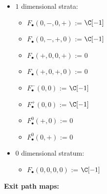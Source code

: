 \begin{itemize}
\item $1$ dimensional strata:
\begin{itemize}
\item $F_\bullet(0,-,0,+)$ := $\C[-1]$
\item $F_\bullet(0,-,+,0)$ := $\C[-1]$
\item $F_\bullet(+,0,0,+)$ := $0$
\item $F_\bullet(+,0,+,0)$ := $0$
\item $F_\bullet^-(0,0)$ := $\C[-1]$
\item $F_\bullet^+(0,0)$ := $\C[-1]$
\item $F_\bullet^0(+,0)$ := $0$
\item $F_\bullet^0(0,+)$ := $0$
\end{itemize}

\item $0$ dimensional stratum:
\begin{itemize}
\item $F_\bullet(0,0,0,0)$ := $\C[-1]$
\end{itemize}
\end{itemize}
\textbf{Exit path maps:}
